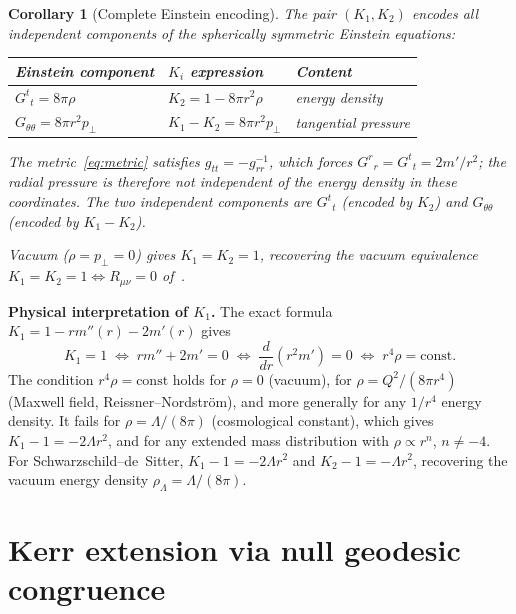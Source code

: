 \documentclass[11pt,a4paper]{article}
\newtheorem{corollary}[theorem]{Corollary}
\begin{document}
\begin{corollary}[Complete Einstein encoding]\label{cor:complete}
The pair $(K_1,K_2)$ encodes all independent components of the
spherically symmetric Einstein equations:

\smallskip
\begin{center}
\renewcommand{\arraystretch}{1.3}
\begin{tabular}{@{}lll@{}}
\toprule
Einstein component & $K_i$ expression & Content \\
\midrule
$G^t{}_t = 8\pi\rho$ &
  $K_2 = 1 - 8\pi r^2\rho$ & energy density \\
$G_{\theta\theta} = 8\pi r^2 p_{\!\perp}$ &
  $K_1-K_2 = 8\pi r^2 p_{\!\perp}$ & tangential pressure \\
\bottomrule
\end{tabular}
\end{center}
\smallskip

\noindent
The metric~\eqref{eq:metric} satisfies $g_{tt}=-g_{rr}^{-1}$, which
forces $G^r{}_r = G^t{}_t = 2m'/r^2$; the radial pressure is
therefore not independent of the energy density in these coordinates.
The two independent components are $G^t{}_t$ (encoded by $K_2$) and
$G_{\theta\theta}$ (encoded by $K_1-K_2$).

Vacuum ($\rho=p_{\!\perp}=0$) gives $K_1=K_2=1$, recovering
the vacuum equivalence $K_1=K_2=1\Leftrightarrow R_{\mu\nu}=0$
of~\cite{K1}.
\end{corollary}

\noindent\textbf{Physical interpretation of $K_1$.}\;
The exact formula $K_1=1-rm''(r)-2m'(r)$ gives
\begin{equation}\label{eq:K1cond}
  K_1=1
  \;\Leftrightarrow\;
  rm''+2m'=0
  \;\Leftrightarrow\;
  \frac{d}{dr}(r^2 m')=0
  \;\Leftrightarrow\;
  r^4\rho = \text{const}.
\end{equation}
The condition $r^4\rho=\text{const}$ holds for $\rho=0$ (vacuum),
for $\rho=Q^2/(8\pi r^4)$ (Maxwell field, Reissner--Nordstr\"{o}m),
and more generally for any $1/r^4$ energy density.
It fails for $\rho=\Lambda/(8\pi)$ (cosmological constant), which
gives $K_1-1=-2\Lambda r^2$, and for any extended mass distribution
with $\rho\propto r^n$, $n\neq -4$.
For Schwarzschild--de~Sitter, $K_1-1=-2\Lambda r^2$ and
$K_2-1=-\Lambda r^2$, recovering the vacuum energy density
$\rho_\Lambda=\Lambda/(8\pi)$.

\section{Kerr extension via null geodesic congruence}
\end{document}
